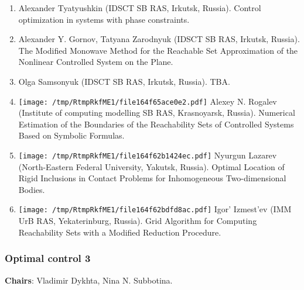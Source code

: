 \documentclass[
]{article}
\providecommand{\tightlist}{%
  \setlength{\itemsep}{0pt}\setlength{\parskip}{0pt}}
\begin{document}
\begin{enumerate}
\def\labelenumi{\arabic{enumi}.}
\tightlist
\item
  Alexander Tyatyushkin (IDSCT SB RAS, Irkutsk, Russia). Control
  optimization in systems with phase constraints.
\item
  Alexander Y. Gornov, Tatyana Zarodnyuk (IDSCT SB RAS, Irkutsk,
  Russia). The Modiﬁed Monowave Method for the Reachable Set
  Approximation of the Nonlinear Controlled System on the Plane.
\item
  Olga Samsonyuk (IDSCT SB RAS, Irkutsk, Russia). TBA.
\item
  \protect\texttt{[image: /tmp/RtmpRkfME1/file164f65ace0e2.pdf]}
  Alexey N. Rogalev (Institute of computing modelling SB RAS,
  Krasnoyarsk, Russia). Numerical Estimation of the Boundaries of the
  Reachability Sets of Controlled Systems Based on Symbolic Formulas.
\item
  \protect\texttt{[image: /tmp/RtmpRkfME1/file164f62b1424ec.pdf]}
  Nyurgun Lazarev (North-Eastern Federal University, Yakutsk, Russia).
  Optimal Location of Rigid Inclusions in Contact Problems for
  Inhomogeneous Two-dimensional Bodies.
\item
  \protect\texttt{[image: /tmp/RtmpRkfME1/file164f62bdfd8ac.pdf]}
  Igor' Izmest'ev (IMM UrB RAS, Yekaterinburg, Russia). Grid Algorithm
  for Computing Reachability Sets with a Modified Reduction Procedure.
\end{enumerate}

\hypertarget{oc3}{%
\subsubsection{Optimal control 3}\label{oc3}}

\textbf{Chairs}: Vladimir Dykhta, Nina N. Subbotina.
\end{document}
